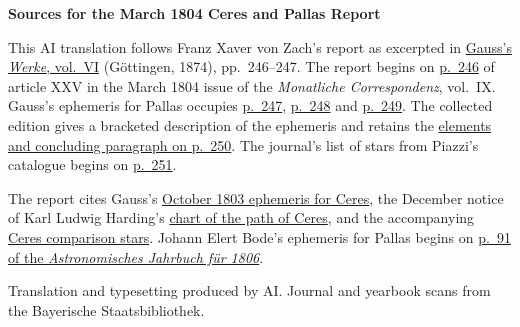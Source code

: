 \clearpage\thispagestyle{empty}
\begin{center}\textbf{Sources for the March 1804 Ceres and Pallas Report}\end{center}
\noindent This AI translation follows Franz Xaver von Zach’s report as excerpted in \href{https://gdz.sub.uni-goettingen.de/id/PPN236007467}{Gauss’s \textit{Werke}, vol.~VI} (Göttingen, 1874), pp.~246--247. The report begins on \href{https://api.digitale-sammlungen.de/iiif/image/v2/bsb10538601_00260/full/1200,/0/default.jpg}{p.~246} of article XXV in the March 1804 issue of the \textit{Monatliche Correspondenz}, vol.~IX. Gauss’s ephemeris for Pallas occupies \href{https://api.digitale-sammlungen.de/iiif/image/v2/bsb10538601_00261/full/1450,/0/default.jpg}{p.~247}, \href{https://api.digitale-sammlungen.de/iiif/image/v2/bsb10538601_00262/full/1450,/0/default.jpg}{p.~248} and \href{https://api.digitale-sammlungen.de/iiif/image/v2/bsb10538601_00263/full/1450,/0/default.jpg}{p.~249}. The collected edition gives a bracketed description of the ephemeris and retains the \href{https://api.digitale-sammlungen.de/iiif/image/v2/bsb10538601_00264/full/1450,/0/default.jpg}{elements and concluding paragraph on p.~250}. The journal’s list of stars from Piazzi’s catalogue begins on \href{https://api.digitale-sammlungen.de/iiif/image/v2/bsb10538601_00265/full/1250,/0/default.jpg}{p.~251}.
\par\smallskip\noindent The report cites Gauss’s \href{https://api.digitale-sammlungen.de/iiif/image/v2/bsb10538600_00380/full/1450,/0/default.jpg}{October 1803 ephemeris for Ceres}, the December notice of Karl Ludwig Harding’s \href{https://api.digitale-sammlungen.de/iiif/image/v2/bsb10538600_00547/full/1450,/0/default.jpg}{chart of the path of Ceres}, and the accompanying \href{https://api.digitale-sammlungen.de/iiif/image/v2/bsb10538600_00548/full/1450,/0/default.jpg}{Ceres comparison stars}. Johann Elert Bode’s ephemeris for Pallas begins on \href{https://api.digitale-sammlungen.de/iiif/image/v2/bsb10538335_00101/full/1450,/0/default.jpg}{p.~91 of the \textit{Astronomisches Jahrbuch für 1806}}.
\par\smallskip\noindent Translation and typesetting produced by AI. Journal and yearbook scans from the Bayerische Staatsbibliothek.
\clearpage
